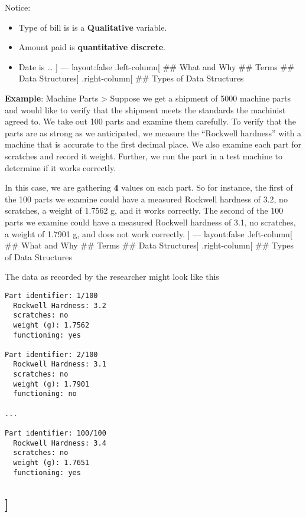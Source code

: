\documentclass[]{article}
\providecommand{\tightlist}{%
  \setlength{\itemsep}{0pt}\setlength{\parskip}{0pt}}
\begin{document}
Notice:

\begin{itemize}
\tightlist
\item
  Type of bill is is a \textbf{Qualitative} variable.
\item
  Amount paid is \textbf{quantitative discrete}.
\item
  Date is \ldots{} {]} --- layout:false .left-column{[} \#\# What and
  Why \#\# Terms \#\# Data Structures{]} .right-column{[} \#\# Types of
  Data Structures
\end{itemize}

\textbf{Example}: Machine Parts \textgreater{} Suppose we get a shipment
of 5000 machine parts and would like to verify that the shipment meets
the standards the machinist agreed to. We take out 100 parts and examine
them carefully. To verify that the parts are as strong as we
anticipated, we measure the ``Rockwell hardness'' with a machine that is
accurate to the first decimal place. We also examine each part for
scratches and record it weight. Further, we run the part in a test
machine to determine if it works correctly.

In this case, we are gathering \textbf{4} values on each part. So for
instance, the first of the 100 parts we examine could have a measured
Rockwell hardness of 3.2, no scratches, a weight of 1.7562 g, and it
works correctly. The second of the 100 parts we examine could have a
measured Rockwell hardness of 3.1, no scratches, a weight of 1.7901 g,
and does not work correctly. {]} --- layout:false .left-column{[} \#\#
What and Why \#\# Terms \#\# Data Structures{]} .right-column{[} \#\#
Types of Data Structures

The data as recorded by the researcher might look like this

\begin{verbatim}
Part identifier: 1/100
  Rockwell Hardness: 3.2
  scratches: no
  weight (g): 1.7562
  functioning: yes

Part identifier: 2/100
  Rockwell Hardness: 3.1
  scratches: no
  weight (g): 1.7901
  functioning: no

...

Part identifier: 100/100
  Rockwell Hardness: 3.4
  scratches: no
  weight (g): 1.7651
  functioning: yes
\end{verbatim}

\subsection{{]}}\label{section-1}
\end{document}
